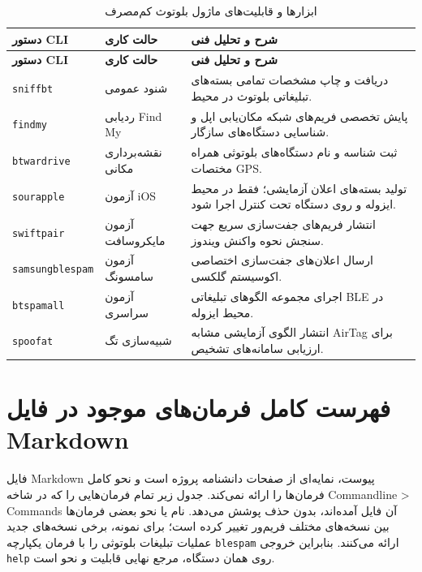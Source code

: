 \documentclass[11pt,a4paper]{article}
\newcommand{\lr}[1]{\foreignlanguage{english}{#1}}
\newcommand{\en}[1]{\lr{#1}}
\newcommand{\cmd}[1]{\lr{\nolinkurl{#1}}}
\begin{document}
\begin{longtable}{llp{8cm}}
\caption{ابزارها و قابلیت‌های ماژول بلوتوث کم‌مصرف} \label{tab:ble-features} \\
\toprule
\textbf{دستور \en{CLI}} & \textbf{حالت کاری} & \textbf{شرح و تحلیل فنی} \\
\midrule
\endfirsthead
\toprule
\textbf{دستور \en{CLI}} & \textbf{حالت کاری} & \textbf{شرح و تحلیل فنی} \\
\midrule
\endhead
\bottomrule
\endfoot
\lr{\texttt{sniffbt}} & شنود عمومی & دریافت و چاپ مشخصات تمامی بسته‌های تبلیغاتی بلوتوث در محیط. \\
\lr{\texttt{findmy}} & ردیابی \en{Find My} & پایش تخصصی فریم‌های شبکه مکان‌یابی اپل و شناسایی دستگاه‌های سازگار. \\
\lr{\texttt{btwardrive}} & نقشه‌برداری مکانی & ثبت شناسه و نام دستگاه‌های بلوتوثی همراه مختصات \en{GPS}. \\
\lr{\texttt{sourapple}} & آزمون \en{iOS} & تولید بسته‌های اعلان آزمایشی؛ فقط در محیط ایزوله و روی دستگاه تحت کنترل اجرا شود. \\
\lr{\texttt{swiftpair}} & آزمون مایکروسافت & انتشار فریم‌های جفت‌سازی سریع جهت سنجش نحوه واکنش ویندوز. \\
\lr{\texttt{samsungblespam}} & آزمون سامسونگ & ارسال اعلان‌های جفت‌سازی اختصاصی اکوسیستم گلکسی. \\
\lr{\texttt{btspamall}} & آزمون سراسری & اجرای مجموعه الگوهای تبلیغاتی \en{BLE} در محیط ایزوله. \\
\lr{\texttt{spoofat}} & شبیه‌سازی تگ & انتشار الگوی آزمایشی مشابه \en{AirTag} برای ارزیابی سامانه‌های تشخیص. \\
\end{longtable}

\newpage
\section{فهرست کامل فرمان‌های موجود در فایل Markdown}
فایل \en{Markdown} پیوست، نمایه‌ای از صفحات دانشنامه پروژه است و نحو کامل فرمان‌ها را ارائه نمی‌کند. جدول زیر تمام فرمان‌هایی را که در شاخه \en{Commandline > Commands} آن فایل آمده‌اند، بدون حذف پوشش می‌دهد. نام یا نحو بعضی فرمان‌ها بین نسخه‌های مختلف فریم‌ور تغییر کرده است؛ برای نمونه، برخی نسخه‌های جدید عملیات تبلیغات بلوتوثی را با فرمان یکپارچه \cmd{blespam} ارائه می‌کنند. بنابراین خروجی \cmd{help} روی همان دستگاه، مرجع نهایی قابلیت و نحو است.
\end{document}
